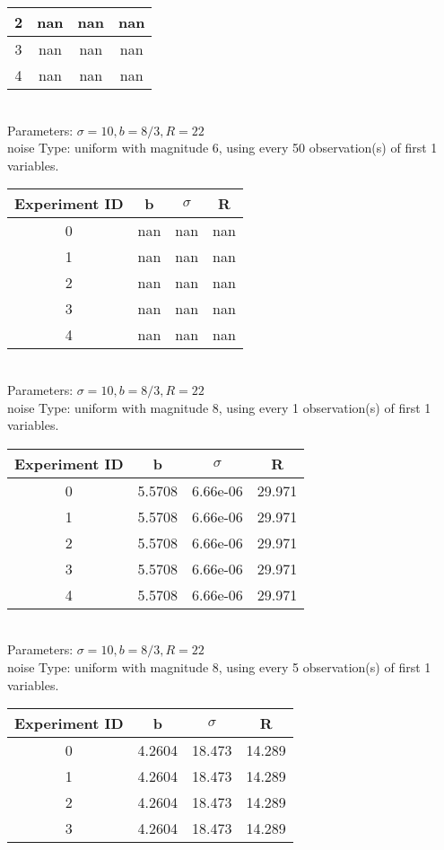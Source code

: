 \begin{multicols}{3}
\begin{tabular}{cccc}
 2 & nan & nan & nan\\ \hline 
 3 & nan & nan & nan\\ \hline 
 4 & nan & nan & nan\\ \hline 
 \end{tabular}\\
Parameters: $\sigma=10, b=8/3, R=22$\\
noise Type: uniform with magnitude 6, using every 50 observation(s) of first 1 variables.\\
\begin{tabular}{cccc}
\hline Experiment ID & b & $\sigma$ & R \\ \hline 
0 & nan & nan & nan\\ \hline 
 1 & nan & nan & nan\\ \hline 
 2 & nan & nan & nan\\ \hline 
 3 & nan & nan & nan\\ \hline 
 4 & nan & nan & nan\\ \hline 
 \end{tabular}\\
Parameters: $\sigma=10, b=8/3, R=22$\\
noise Type: uniform with magnitude 8, using every 1 observation(s) of first 1 variables.\\
\begin{tabular}{cccc}
\hline Experiment ID & b & $\sigma$ & R \\ \hline 
0 & 5.5708 & 6.66e-06 & 29.971\\ \hline 
 1 & 5.5708 & 6.66e-06 & 29.971\\ \hline 
 2 & 5.5708 & 6.66e-06 & 29.971\\ \hline 
 3 & 5.5708 & 6.66e-06 & 29.971\\ \hline 
 4 & 5.5708 & 6.66e-06 & 29.971\\ \hline 
 \end{tabular}\\
Parameters: $\sigma=10, b=8/3, R=22$\\
noise Type: uniform with magnitude 8, using every 5 observation(s) of first 1 variables.\\
\begin{tabular}{cccc}
\hline Experiment ID & b & $\sigma$ & R \\ \hline 
0 & 4.2604 & 18.473 & 14.289\\ \hline 
 1 & 4.2604 & 18.473 & 14.289\\ \hline 
 2 & 4.2604 & 18.473 & 14.289\\ \hline 
 3 & 4.2604 & 18.473 & 14.289\\ \hline 

\end{tabular}
\end{multicols}

